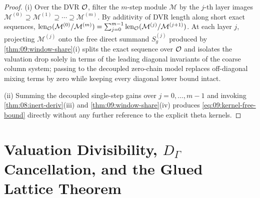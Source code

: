 \begin{proof}
(i) Over the DVR $\mathcal{O}$, filter the $m$-step module $\mathcal{M}$ by the $j$-th layer images $\mathcal{M}^{(0)} \supseteq \mathcal{M}^{(1)} \supseteq \cdots \supseteq \mathcal{M}^{(m)}$. By additivity of DVR length along short exact sequences, $\operatorname{len}_{\mathcal{O}}(\mathcal{M}^{(0)} / \mathcal{M}^{(m)}) = \sum_{j=0}^{m-1} \operatorname{len}_{\mathcal{O}}(\mathcal{M}^{(j)} / \mathcal{M}^{(j+1)})$. At each layer $j$, projecting $\mathcal{M}^{(j)}$ onto the free direct summand $S_g^{(j)}$ produced by \cref{thm:09:window-share}(i) splits the exact sequence over $\mathcal{O}$ and isolates the valuation drop solely in terms of the leading diagonal invariants of the coarse column system; passing to the decoupled zero-chain model replaces off-diagonal mixing terms by zero while keeping every diagonal lower bound intact.

(ii) Summing the decoupled single-step gains over $j = 0, \dots, m - 1$ and invoking \cref{thm:08:inert-deriv}(iii) and \cref{thm:09:window-share}(iv) produces \eqref{eq:09:kernel-free-bound} directly without any further reference to the explicit theta kernels.
\end{proof}

\section{Valuation Divisibility, $D_\Gamma$ Cancellation, and the Glued Lattice Theorem}
\label{sec:09:glued-lattice}

